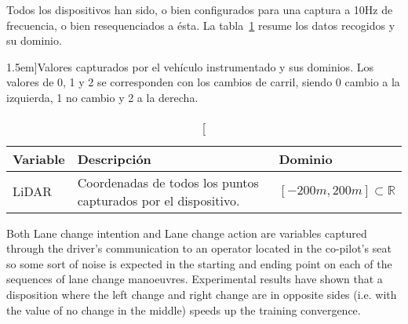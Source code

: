 Todos los dispositivos han sido, o bien configurados para una captura a 10Hz de frecuencia, o bien resequenciados a ésta. La tabla~\ref{tbl:data-obtained-from-instrumented-vehicle} resume los datos recogidos y su dominio.

\begin{table}[t]
	\caption[Resúmen de información extraída del vehículo instrumentado][1.5em]{Valores capturados por el vehículo instrumentado y sus dominios. Los valores de 0, 1 y 2 se corresponden con los cambios de carril, siendo 0 cambio a la izquierda, 1 no cambio y 2 a la derecha.}
	\label{tbl:data-obtained-from-instrumented-vehicle}
	\begin{tabular}{lll}
		\toprule
		Variable & Descripción & Dominio \\
		\midrule
		LiDAR & Coordenadas de todos los puntos capturados por el dispositivo. & $[-200m, 200m] \subset \mathbb{R}$ \\
		\bottomrule
	\end{tabular}
\end{table}




Both Lane change intention and Lane change action are variables captured through the driver’s communication to an operator located in the co-pilot’s seat so some sort of noise is expected in the starting and ending point on each of the sequences of lane change manoeuvres. Experimental results have shown that a disposition where the left change and right change are in opposite sides (i.e. with the value of no change in the middle) speeds up the training convergence.
